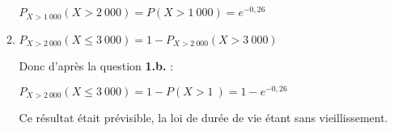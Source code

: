 \begin{corrige}
\begin{enumerate}
\begin{enumerate}[label=\alph*.]
               $P_{X > 1~000}\left(X > 2~000\right)=P\left(X > 1~000\right)=e^{-0,26}$
               \item $P_{X > 2~000}\left(X\leqslant 3~000\right)=1-P_{X > 2~000}\left(X > 3~000\right) $
               \par
               Donc d'après la question \textbf{1.b.} :
               \par
               $P_{X > 2~000}\left(X\leqslant 3~000\right)=1-P\left(X > 1~\right)=1-e^{-0,26}$
               \par
               Ce résultat était prévisible, la loi de durée de vie étant sans vieillissement.
          \end{enumerate}
     \end{enumerate}
\end{corrige}
